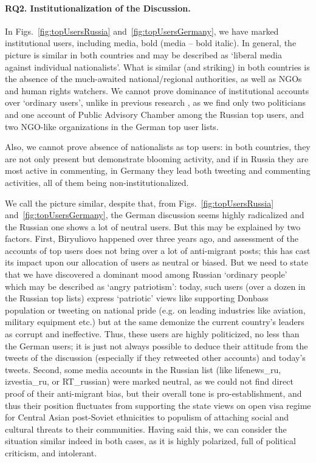 \paragraph{RQ2. Institutionalization of the Discussion.} In Figs.~\cref{fig:topUsersRussia} and~\cref{fig:topUsersGermany}, we have marked institutional users, including media, bold (media -- bold italic). In general, the picture is similar in both countries and may be described as ‘liberal media against individual nationalists’. What is similar (and striking) in both countries is the absence of the much-awaited national/regional authorities, as well as NGOs and human rights watchers. We cannot prove dominance of institutional accounts over ‘ordinary users’, unlike in previous research \cite{XuSangBlasiola}, as we find only two politicians and one account of Public Advisory Chamber among the Russian top users, and two NGO-like organizations in the German top user lists.

Also, we cannot prove absence of nationalists as top users: in both countries, they are not only present but demonstrate blooming activity, and if in Russia they are most active in commenting, in Germany they lead both tweeting and commenting activities, all of them being non-institutionalized.

We call the picture similar, despite that, from Figs.~\cref{fig:topUsersRussia} and~\cref{fig:topUsersGermany}, the German discussion seems highly radicalized and the Russian one shows a lot of neutral users. But this may be explained by two factors. First, Biryuliovo happened over three years ago, and assessment of the accounts of top users does not bring over a lot of anti-migrant posts; this has cast its impact upon our allocation of users as neutral or biased. But we need to state that we have discovered a dominant mood among Russian ‘ordinary people’ which may be described as ‘angry patriotism’: today, such users (over a dozen in the Russian top lists) express ‘patriotic’ views like supporting Donbass population or tweeting on national pride (e.g. on leading industries like aviation, military equipment etc.) but at the same demonize the current country’s leaders as corrupt and ineffective. Thus, these users are highly politicized, no less than the German users; it is just not always possible to deduce their attitude from the tweets of the discussion (especially if they retweeted other accounts) and today’s tweets. Second, some media accounts in the Russian list (like lifenews\_ru, izvestia\_ru, or RT\_russian) were marked neutral, as we could not find direct proof of their anti-migrant bias, but their overall tone is pro-establishment, and thus their position fluctuates from supporting the state views on open visa regime for Central Asian post-Soviet ethnicities to populism of attaching social and cultural threats to their communities. Having said this, we can consider the situation similar indeed in both cases, as it is highly polarized, full of political criticism, and intolerant.

